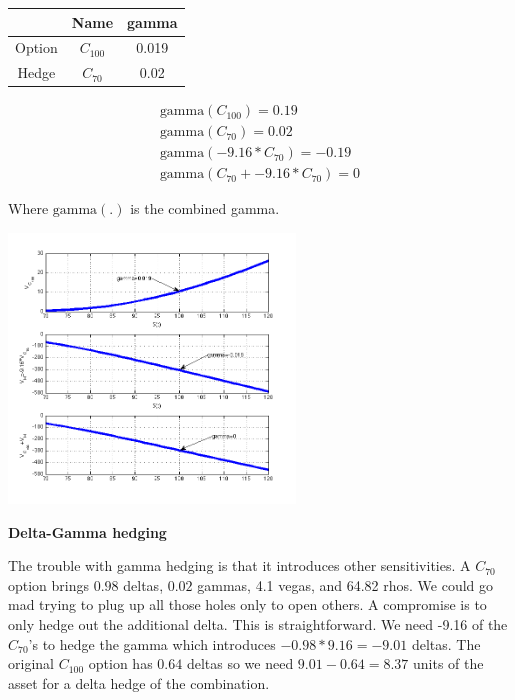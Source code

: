 \begin{center}
\begin{tabular}{|c|cc|}
\hline
 & Name & gamma\\
\hline
Option & $C_{100}$ & 0.019\\
Hedge & $C_{70}$ & 0.02\\
\hline
\end{tabular}
\end{center}

\begin{eqnarray*}
\mbox{gamma}(C_{100}) = 0.19\\
\mbox{gamma}(C_{70}) = 0.02\\
\mbox{gamma}(-9.16*C_{70}) = -0.19\\
\mbox{gamma}(C_{70} + -9.16*C_{70}) = 0
\end{eqnarray*}

Where $\mbox{gamma}(.)$ is the combined gamma.

  \begin{center}
\includegraphics[width=3in]{pics/gammaHedge}%
\label{fig:gammaHedge}%
\end{center}





\textbf{Delta-Gamma hedging}

The trouble with gamma hedging is that it introduces other sensitivities. A $C_{70}$ option brings $0.98$ deltas, $0.02$ gammas, 4.1 vegas, and 64.82 rhos.  We could go mad trying to plug up all those holes only to open others. A compromise is to only hedge out the additional delta. This is straightforward. We need -9.16 of the $C_{70}$'s to hedge the gamma which introduces $-0.98*9.16 = -9.01$ deltas. The original $C_{100}$ option has $0.64$ deltas so we need $9.01-0.64 = 8.37$ units of the asset for a delta hedge of the combination. 

